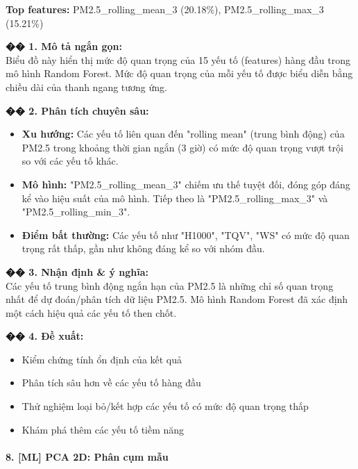 \documentclass[12pt,a4paper]{article}
\begin{document}
\begin{aibox}
\textbf{Top features:} PM2.5\_rolling\_mean\_3 (20.18\%), PM2.5\_rolling\_max\_3 (15.21\%)

\textbf{�� 1. Mô tả ngắn gọn:}\\
Biểu đồ này hiển thị mức độ quan trọng của 15 yếu tố (features) hàng đầu trong mô hình Random Forest. Mức độ quan trọng của mỗi yếu tố được biểu diễn bằng chiều dài của thanh ngang tương ứng.

\textbf{�� 2. Phân tích chuyên sâu:}
\begin{itemize}
    \item \textbf{Xu hướng:} Các yếu tố liên quan đến "rolling mean" (trung bình động) của PM2.5 trong khoảng thời gian ngắn (3 giờ) có mức độ quan trọng vượt trội so với các yếu tố khác.
    \item \textbf{Mô hình:} "PM2.5\_rolling\_mean\_3" chiếm ưu thế tuyệt đối, đóng góp đáng kể vào hiệu suất của mô hình. Tiếp theo là "PM2.5\_rolling\_max\_3" và "PM2.5\_rolling\_min\_3".
    \item \textbf{Điểm bất thường:} Các yếu tố như "H1000", "TQV", "WS" có mức độ quan trọng rất thấp, gần như không đáng kể so với nhóm đầu.
\end{itemize}

\textbf{�� 3. Nhận định \& ý nghĩa:}\\
Các yếu tố trung bình động ngắn hạn của PM2.5 là những chỉ số quan trọng nhất để dự đoán/phân tích dữ liệu PM2.5. Mô hình Random Forest đã xác định một cách hiệu quả các yếu tố then chốt.

\textbf{�� 4. Đề xuất:}
\begin{itemize}
    \item Kiểm chứng tính ổn định của kết quả
    \item Phân tích sâu hơn về các yếu tố hàng đầu
    \item Thử nghiệm loại bỏ/kết hợp các yếu tố có mức độ quan trọng thấp
    \item Khám phá thêm các yếu tố tiềm năng
\end{itemize}
\end{aibox}

\paragraph{8. [ML] PCA 2D: Phân cụm mẫu}
\end{document}
